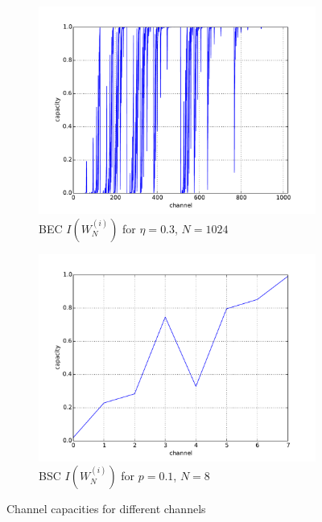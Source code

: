 \documentclass[a4paper,12pt]{scrartcl}
\begin{document}
\begin{figure}[htb]
  \centering
  \begin{subfigure}{.49\textwidth}
  \centering
   \includegraphics[width=\textwidth]{figure/bec_capacity_0_3_1024.pdf}
   \caption{\acs{BEC} $I (W^{(i)}_N )$ for $\eta=0.3$, $N=1024$}
   \label{fig:bec_capacity}
  \end{subfigure}
  \begin{subfigure}{.49\textwidth}
  \centering
   \includegraphics[width=\textwidth]{figure/bsc_capacity_0_1_8.pdf}
   \caption{\acs{BSC} $I (W^{(i)}_N )$ for $p=0.1$, $N=8$}
   \label{fig:bsc_capacity}
  \end{subfigure}
  \caption{Channel capacities for different channels}
  \label{fig:capacity}
\end{figure}
\end{document}
